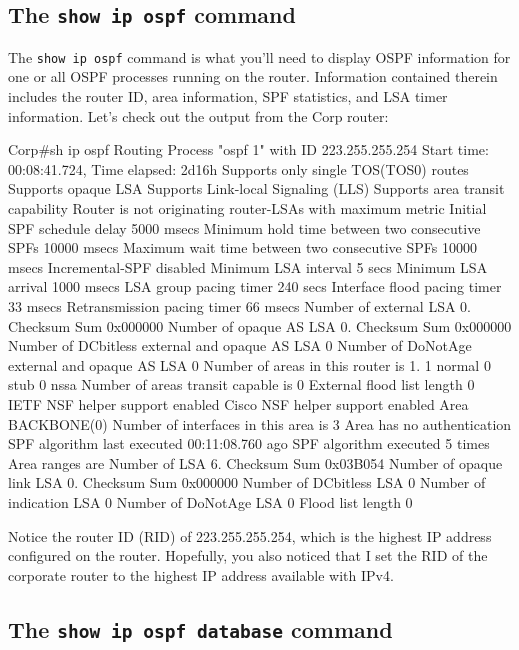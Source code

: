\subsection{The \texttt{show ip ospf} command}

The \texttt{show\ ip\ ospf} command is what you'll need to display OSPF
information for one or all OSPF processes running on the router.
Information contained therein includes the router ID, area information,
SPF statistics, and LSA timer information. Let's check out the output
from the Corp router:

\begin{cli}
Corp#sh ip ospf
 Routing Process "ospf 1" with ID 223.255.255.254
 Start time: 00:08:41.724, Time elapsed: 2d16h
 Supports only single TOS(TOS0) routes
 Supports opaque LSA
 Supports Link-local Signaling (LLS)
 Supports area transit capability
 Router is not originating router-LSAs with maximum metric
 Initial SPF schedule delay 5000 msecs
 Minimum hold time between two consecutive SPFs 10000 msecs
 Maximum wait time between two consecutive SPFs 10000 msecs
 Incremental-SPF disabled
 Minimum LSA interval 5 secs
 Minimum LSA arrival 1000 msecs
 LSA group pacing timer 240 secs
 Interface flood pacing timer 33 msecs
 Retransmission pacing timer 66 msecs
 Number of external LSA 0. Checksum Sum 0x000000
 Number of opaque AS LSA 0. Checksum Sum 0x000000
 Number of DCbitless external and opaque AS LSA 0
 Number of DoNotAge external and opaque AS LSA 0
 Number of areas in this router is 1. 1 normal 0 stub 0 nssa
 Number of areas transit capable is 0
 External flood list length 0
 IETF NSF helper support enabled
 Cisco NSF helper support enabled
    Area BACKBONE(0)
        Number of interfaces in this area is 3
        Area has no authentication
        SPF algorithm last executed 00:11:08.760 ago
        SPF algorithm executed 5 times
        Area ranges are
        Number of LSA 6. Checksum Sum 0x03B054
        Number of opaque link LSA 0. Checksum Sum 0x000000
        Number of DCbitless LSA 0
        Number of indication LSA 0
        Number of DoNotAge LSA 0
        Flood list length 0
\end{cli}

Notice the router ID (RID) of 223.255.255.254, which is the highest IP
address configured on the router. Hopefully, you also noticed that I set
the RID of the corporate router to the highest IP address available with
IPv4.

\subsection{The \texttt{show ip ospf database} command}

